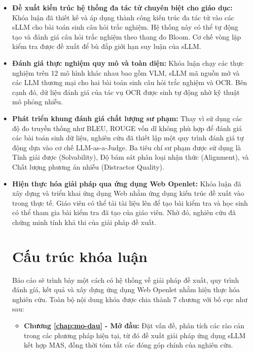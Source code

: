 \begin{itemize}
    \item \textbf{Đề xuất kiến trúc hệ thống đa tác tử chuyên biệt cho giáo dục:} Khóa luận đã thiết kế và áp dụng thành công kiến trúc đa tác tử vào các sLLM cho bài toán sinh câu hỏi trắc nghiệm. Hệ thống này có thể tự động tạo và đánh giá câu hỏi trắc nghiệm theo thang đo Bloom. Cơ chế vòng lặp kiểm tra được đề xuất để bù đắp giới hạn suy luận của sLLM.

 \item \textbf{Đánh giá thực nghiệm quy mô và toàn diện:} Khóa luận chạy các thực nghiệm trên 12 mô hình khác nhau bao gồm VLM, sLLM mã nguồn mở và các LLM thương mại cho hai bài toán sinh câu hỏi trắc nghiệm và OCR. Bên cạnh đó, dữ liệu đánh giá của tác vụ OCR được sinh tự động nhờ kỹ thuật mô phỏng nhiễu.

\item \textbf{Phát triển khung đánh giá chất lượng sư phạm:} Thay vì sử dụng các độ đo truyền thống như BLEU, ROUGE vốn dĩ không phù hợp để đánh giá các bài toán sinh dữ liệu, nghiên cứu đã thiết lập một quy trình đánh giá tự động dựa vào cơ chế LLM-as-a-Judge. Ba tiêu chí sư phạm được sử dụng là Tính giải được (Solvability), Độ bám sát phân loại nhận thức (Alignment), và Chất lượng phương án nhiễu (Distractor Quality).

 \item \textbf{Hiện thực hóa giải pháp qua ứng dụng Web Openlet:} Khóa luận đã xây dựng và triển khai ứng dụng Web nhằm ứng dụng kiến trúc đề xuất vào trong thực tế. Giáo viên có thể tải tài liệu lên để tạo bài kiểm tra và học sinh có thể tham gia bài kiểm tra đã tạo của giáo viên. Nhờ đó, nghiên cứu đã chứng minh tính khả thi của giải pháp đề xuất.

\section{Cấu trúc khóa luận}

Báo cáo sẽ trình bày một cách có hệ thống về giải pháp đề xuất, quy trình đánh gíá, kết quả và xây dựng ứng dụng Web Openlet nhằm hiện thực hóa nghiên cứu. Toàn bộ nội dung khóa được chia thành 7 chương với bố cục như sau:

 \begin{itemize}
    \item \textbf{Chương \ref{chap:mo-dau} - Mở đầu:} Đặt vấn đề, phân tích các rào cản trong các phương pháp hiện tại, từ đó đề xuất giải pháp ứng dụng sLLM kết hợp MAS, đồng thời tóm tắt các đóng góp chính của nghiên cứu.
    

\end{itemize}
\end{itemize}
